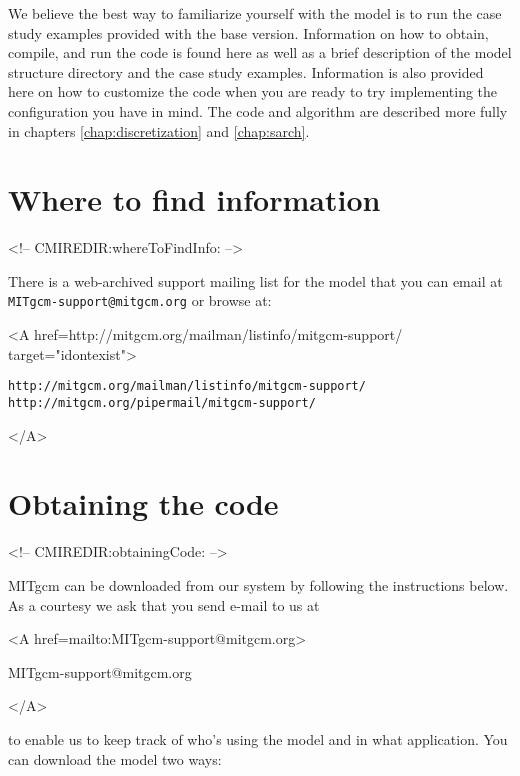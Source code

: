 

We believe the best way to familiarize yourself with the
model is to run the case study examples provided with the base
version. Information on how to obtain, compile, and run the code is
found here as well as a brief description of the model structure
directory and the case study examples. Information is also provided
here on how to customize the code when you are ready to try implementing 
the configuration you have in mind.  The code and algorithm
are described more fully in chapters \ref{chap:discretization} and 
\ref{chap:sarch}. 

\section{Where to find information}
\label{sec:whereToFindInfo}
\begin{rawhtml}
<!-- CMIREDIR:whereToFindInfo: -->
\end{rawhtml}

There is a web-archived support mailing list for the model that
you can email at \texttt{MITgcm-support@mitgcm.org} or browse at:
\begin{rawhtml} <A href=http://mitgcm.org/mailman/listinfo/mitgcm-support/ target="idontexist"> \end{rawhtml}
\begin{verbatim}
http://mitgcm.org/mailman/listinfo/mitgcm-support/
http://mitgcm.org/pipermail/mitgcm-support/
\end{verbatim}
\begin{rawhtml} </A> \end{rawhtml}

\section{Obtaining the code}
\label{sec:obtainingCode}
\begin{rawhtml}
<!-- CMIREDIR:obtainingCode: -->
\end{rawhtml}

MITgcm can be downloaded from our system by following
the instructions below. As a courtesy we ask that you send e-mail to us at
\begin{rawhtml} <A href=mailto:MITgcm-support@mitgcm.org> \end{rawhtml}
MITgcm-support@mitgcm.org
\begin{rawhtml} </A> \end{rawhtml}
to enable us to keep track of who's using the model and in what application.
You can download the model two ways:

